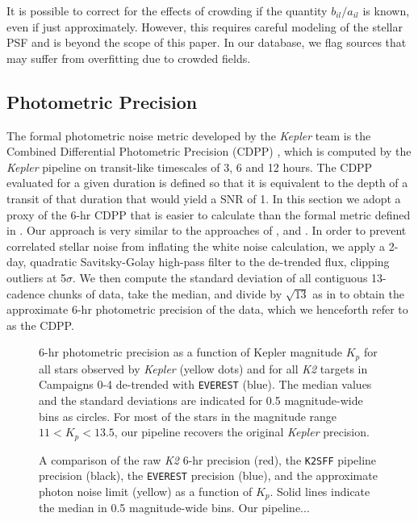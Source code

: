 \documentclass[]{emulateapj}
\newcommand{\note}[1]{{\color{red} #1}}
\begin{document}
It is possible to correct for the effects of crowding if the quantity $b_{il}/a_{il}$
is known, even if just approximately. However, this requires careful modeling of the
stellar PSF and is beyond the scope of this paper. In our database, we flag sources
that may suffer from overfitting due to crowded fields.

\subsection{Photometric Precision}
\label{sec:precision}
The formal photometric noise metric developed by the \emph{Kepler} team is the
Combined Differential Photometric Precision (CDPP) \citep{CHR12}, which is computed
by the \emph{Kepler} pipeline on transit-like timescales of 3, 6 and 12 hours.
The CDPP evaluated for a given duration is defined so that it is equivalent to the 
depth of a transit of that duration that would yield a SNR of 1. In this section we adopt a proxy 
of the 6-hr CDPP that is easier to calculate than
the formal metric defined in \cite{CHR12}. Our approach is very similar to the approaches
of \cite{GIL11}, \cite{VJ14} and \cite{AIG16}. In order to prevent correlated stellar
noise from inflating the white noise calculation, we apply a 2-day, quadratic Savitsky-Golay 
high-pass filter to the de-trended flux, clipping
outliers at 5$\sigma$. We then compute the standard deviation of all contiguous 13-cadence
chunks of data, take the median, and divide by $\sqrt{13}$ as in \cite{VJ14} to obtain
the approximate 6-hr photometric precision of the data, which we henceforth refer to
as the CDPP.

\label{sec:precision}
\begin{figure}[h]
  \begin{center}
       \caption{6-hr photometric precision as a function of Kepler magnitude $K_p$
                for all stars observed by \emph{Kepler} (yellow dots) and for
                all \emph{K2} targets in Campaigns 0-4 de-trended with \texttt{EVEREST}
                (blue). The median values and the standard deviations are indicated
                for 0.5 magnitude-wide bins as circles.
                For most of the stars in the magnitude range $11 < K_p < 13.5$,
                our pipeline recovers the original \emph{Kepler} precision.}
     \label{fig:precision1}
  \end{center}
\end{figure}
\begin{figure}[h]
  \begin{center}
       \caption{A comparison of the raw \emph{K2} 6-hr precision (red), the \texttt{K2SFF}
       pipeline precision (black), the \texttt{EVEREST} precision (blue), and the
       approximate photon noise limit (yellow) as a function of $K_p$. Solid lines
       indicate the median in 0.5 magnitude-wide bins. \note{Our pipeline...}}
     \label{fig:precision2}
  \end{center}
\end{figure}
\end{document}
